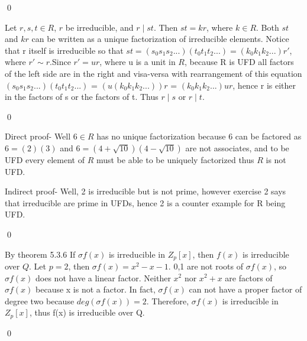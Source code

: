 \documentclass[11pt]{article}
\begin{document}
\qed


\proof
{
Let \(r,s,t \in R \), \(r\) be irreducible, and \(r\mid st\). Then \(st = kr\), where \(k \in R\). Both \(st\) and \(kr\) can be written as a unique factorization of irreducible elements. Notice that r itself is irreducible so that \(st = (s_0s_1s_2...)(t_0t_1t_2...)= (k_0k_1k_2...)r'\), where \(r'\sim r\).Since \(r' = ur\), where u is a unit in \(R\), because R is UFD all factors of the left side are in the right and visa-versa  with rearrangement of this equation \((s_0s_1s_2...)(t_0t_1t_2...)\) = \((u(k_0k_1k_2...))r\) = \((k_0k_1k_2...)ur\), hence r is either in the factors of s or the factors of t. Thus \(r\mid s \) or \(r\mid t\).
}

\qed


\proof
{
    Direct proof- Well \(6\in R\) has no unique factorization because 6 can be factored as \(6 = (2)(3)\) and \(6 =  (4+\sqrt{10})(4-\sqrt{10})\) are not associates, and to be UFD every element of \(R\) must be able to be uniquely factorized thus \(R\) is not UFD.
    
    Indirect proof- Well, 2 is irreducible but is not prime, however exercise 2 says that irreducible are prime in UFDs, hence 2 is a counter example for R being UFD.
    
}
\qed


\proof
{
    By theorem 5.3.6 If \(σ f(x)\) is irreducible in \(Z_p[x]\), then \(f(x)\) is irreducible over \(Q\). Let \(p = 2\), then \(\sigma f(x)= x^2-x-1\). 0,1 are not roots of \(\sigma f(x)\), so \(\sigma f(x)\) does not have a linear factor. Neither \(x^2\) nor \(x^2+x\) are factors of \(\sigma f(x)\) because x is not a factor. In fact, \(\sigma f(x)\) can not have a proper factor of degree two because \(deg(\sigma f(x)) = 2\). Therefore, \(\sigma f(x)\) is irreducible in \(Z_p[x]\), thus f(x) is irreducible over Q. 
}

\qed
\end{document}
